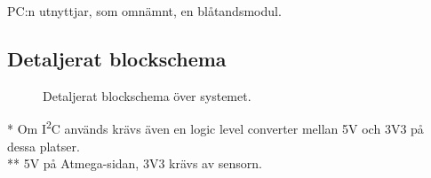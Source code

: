 \documentclass[a4paper,11pt]{article}
\begin{document}
PC:n utnyttjar, som omnämnt, en blåtandsmodul.

\newpage
\begin{appendices}

\section{Detaljerat blockschema}
\begin{figure}[h!]
    \caption{Detaljerat blockschema över systemet.}
    \label{fig:modulesDetailed}
\end{figure}

\noindent \begin{small}
    * Om I\textsuperscript{2}C används krävs även en logic level converter mellan 5V och 3V3 på dessa platser.\\
    ** 5V på Atmega-sidan, 3V3 krävs av sensorn.
\end{small}


\end{appendices}
\end{document}
